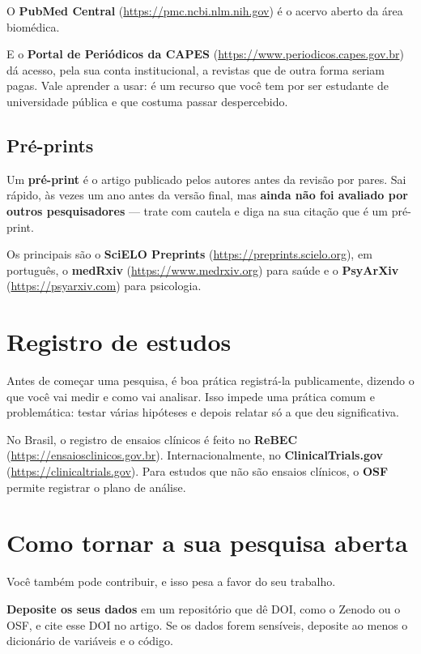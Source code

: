 \documentclass[
]{book}
\begin{document}
O \textbf{PubMed Central} (\url{https://pmc.ncbi.nlm.nih.gov}) é o acervo aberto da área biomédica.

E o \textbf{Portal de Periódicos da CAPES} (\url{https://www.periodicos.capes.gov.br}) dá acesso, pela sua conta institucional, a revistas que de outra forma seriam pagas. Vale aprender a usar: é um recurso que você tem por ser estudante de universidade pública e que costuma passar despercebido.

\subsection{Pré-prints}\label{pruxe9-prints}

Um \textbf{pré-print} é o artigo publicado pelos autores antes da revisão por pares. Sai rápido, às vezes um ano antes da versão final, mas \textbf{ainda não foi avaliado por outros pesquisadores} --- trate com cautela e diga na sua citação que é um pré-print.

Os principais são o \textbf{SciELO Preprints} (\url{https://preprints.scielo.org}), em português, o \textbf{medRxiv} (\url{https://www.medrxiv.org}) para saúde e o \textbf{PsyArXiv} (\url{https://psyarxiv.com}) para psicologia.

\section{Registro de estudos}\label{registro-de-estudos}

Antes de começar uma pesquisa, é boa prática registrá-la publicamente, dizendo o que você vai medir e como vai analisar. Isso impede uma prática comum e problemática: testar várias hipóteses e depois relatar só a que deu significativa.

No Brasil, o registro de ensaios clínicos é feito no \textbf{ReBEC} (\url{https://ensaiosclinicos.gov.br}). Internacionalmente, no \textbf{ClinicalTrials.gov} (\url{https://clinicaltrials.gov}). Para estudos que não são ensaios clínicos, o \textbf{OSF} permite registrar o plano de análise.

\section{Como tornar a sua pesquisa aberta}\label{como-tornar-a-sua-pesquisa-aberta}

Você também pode contribuir, e isso pesa a favor do seu trabalho.

\textbf{Deposite os seus dados} em um repositório que dê DOI, como o Zenodo ou o OSF, e cite esse DOI no artigo. Se os dados forem sensíveis, deposite ao menos o dicionário de variáveis e o código.
\end{document}
